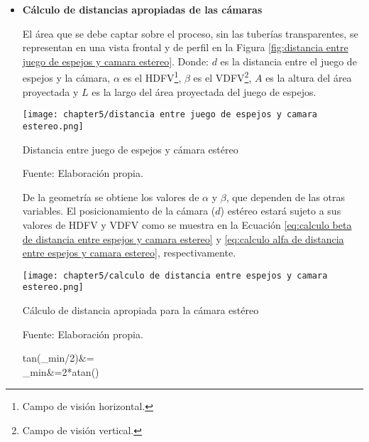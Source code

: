 \begin{itemize}
	
	\item \textbf{Cálculo de distancias apropiadas de las cámaras}
	
	El área que se debe captar sobre el proceso, sin las tuberías transparentes, se representan  en una vista frontal y de perfil en la Figura \ref{fig:distancia entre juego de espejos y camara estereo}. Donde: $d$ es la distancia entre el juego de espejos y la cámara, $\alpha$ es el HDFV\footnote{Campo de visión horizontal.}, $\beta$ es el VDFV\footnote{Campo de visión vertical.}, $A$ es la altura del área proyectada y $L$ es la largo del área proyectada del juego de espejos.
	
	\begin{myfigure}[H]
		\footnotesize\centering
		\texttt{[image: chapter5/distancia entre juego de espejos y camara estereo.png]}
		\caption{Distancia entre juego de espejos y cámara estéreo}
		\begin{myflushcenter}
			Fuente: Elaboración propia.
		\end{myflushcenter}
		\label{fig:distancia entre juego de espejos y camara estereo}
	\end{myfigure}

	De la geometría se obtiene los valores de $\alpha$ y $\beta$, que dependen de las otras variables. El posicionamiento de la cámara ($d$) estéreo estará sujeto a sus valores de HDFV y VDFV como se muestra en la Ecuación \ref{eq:calculo beta de distancia entre espejos y camara estereo} y \ref{eq:calculo alfa de distancia entre espejos y camara estereo}, respectivamente.
		
	\begin{myfigure}[H]
		\footnotesize\centering
		\texttt{[image: chapter5/calculo de distancia entre espejos y camara estereo.png]}
		\caption{Cálculo de distancia apropiada para la cámara estéreo}
		\begin{myflushcenter}
			Fuente: Elaboración propia.
		\end{myflushcenter}
		\label{fig:calculo de distancia entre espejos y camara estereo}
	\end{myfigure}
	
	\begin{myequation}\label{eq:calculo alfa de distancia entre espejos y camara estereo}
		\begin{split}
			tan(\alpha_{min}/2)&=\\
			\alpha_{min}&=2*atan()\\
		\end{split}		
	\end{myequation}


\end{itemize}
